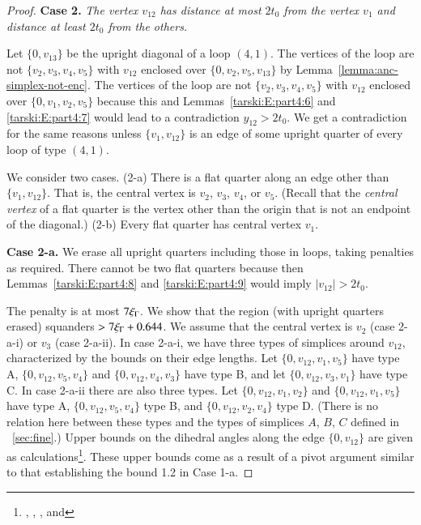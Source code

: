 \begin{proof}
\medskip

{\bf Case 2.} {\it The vertex $v_{12}$ has distance at most $2t_0$
from the vertex $v_1$ and distance at least $2t_0$ from the
others.}

Let $\{0,v_{13}\}$ be the upright diagonal of a loop $(4,1)$.  The
vertices of the loop are not $\{v_2,v_3,v_4,v_5\}$ with $v_{12}$
enclosed over $\{0,v_2,v_5,v_{13}\}$ by
Lemma~\ref{lemma:anc-simplex-not-enc}. The vertices of the loop
are not $\{v_2,v_3,v_4,v_5\}$ with $v_{12}$ enclosed over
$\{0,v_1,v_2,v_5\}$ because this and Lemmas~\ref{tarski:E:part4:6}
and \ref{tarski:E:part4:7} would lead to a contradiction
$y_{12}>2t_0$. 
We get a contradiction for the same reasons
 unless $\{v_1,v_{12}\}$ is an edge of some
upright quarter of every loop of type $(4,1)$.

We consider two cases.  (2-a) There is a flat quarter along an
edge other than $\{v_1,v_{12}\}$.  That is, the central vertex is
$v_2$, $v_3$, $v_4$, or $v_5$.  (Recall that the {\it central
vertex} of a flat quarter is the vertex other than the origin that
is not an endpoint of the diagonal.) (2-b) Every flat quarter has
central vertex $v_1$.

{\bf Case 2-a.}  We erase all upright quarters including those in
loops, taking penalties as required. There cannot be two flat
quarters because then Lemmas~\ref{tarski:E:part4:8} and
\ref{tarski:E:part4:9} would imply $|v_{12}|>2t_0$.

The penalty is at most $7\xi_\Gamma$.  We show that the region (with
upright quarters erased) squanders $>7\xi_\Gamma+0.644$.  We assume that
the central vertex is $v_2$ (case 2-a-i) or $v_3$ (case 2-a-ii).
In case 2-a-i, we have three types of simplices around $v_{12}$,
characterized by the bounds on their edge lengths.  Let
$\{0,v_{12},v_1,v_5\}$ have type A, $\{0,v_{12},v_5,v_4\}$ and
$\{0,v_{12},v_4,v_3\}$ have type B, and let $\{0,v_{12},v_3,v_1\}$
have type C.  In case 2-a-ii there are also three types.  Let
$\{0,v_{12},v_1,v_2\}$ and $\{0,v_{12},v_1,v_5\}$ have type A,
$\{0,v_{12},v_5,v_4\}$ type B, and $\{0,v_{12},v_2,v_4\}$ type D.
(There is no relation here between these types and the types of
simplices $A$, $B$, $C$ defined in \Chap~\ref{sec:fine}.) Upper
bounds on the dihedral angles along the edge $\{0,v_{12}\}$ are
given as calculations\footnote{, ,
, and }. These upper bounds come
as a result of a pivot argument similar to that establishing the
bound 1.2 in Case 1-a.


\end{proof}

